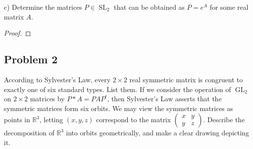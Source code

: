 \documentclass{article}
\theoremstyle{definition}
\newcommand{\R}{\mathbb{R}}
\newcommand{\GL}{\operatorname{GL}}
\newcommand{\SL}{\operatorname{SL}}
\begin{document}
\begin{tcolorbox}
c) Determine the matrices $P \in \SL_2$ that can be obtained as $P = e^A$ for some real matrix $A$.
\end{tcolorbox}

\begin{proof}
\end{proof}

\subsection*{Problem 2}

\begin{tcolorbox}
According to Sylvester's Law, every $2 \times 2$ real symmetric matrix is congruent to exactly one of six standard types.
List them.
If we consider the operation of $\GL_2$ on $2 \times 2$ matrices by $P * A = PAP^t$, then Sylvester's Law asserts that the symmetric matrices form six orbits.
We may view the symmetric matrices as points in $\R^3$, letting $(x,y,z)$ correspond to the matrix
$
\begin{pmatrix}
    x & y \\
    y & z
\end{pmatrix}
$.
Describe the decomposition of $\R^3$ into orbits geometrically, and make a clear drawing depicting it.
\end{tcolorbox}
\end{document}
